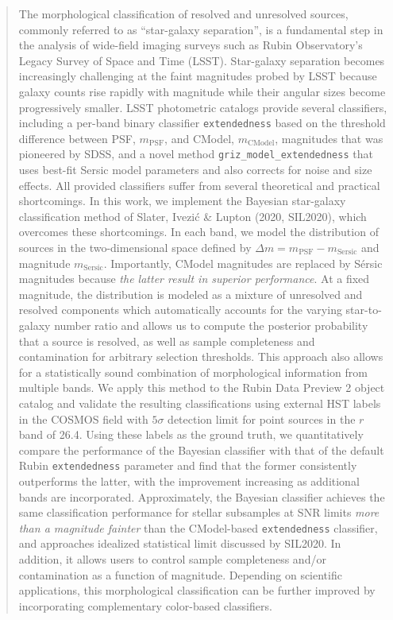 \documentclass[linenumbers,amsmath,trackchanges]{aastex702}
\begin{document}
\begin{abstract}
The morphological classification of resolved and unresolved sources, commonly referred to as ``star-galaxy
separation'', is a fundamental step in the analysis of wide-field imaging surveys such as Rubin Observatory's
Legacy Survey of Space and Time (LSST). Star-galaxy separation becomes increasingly challenging at
the faint magnitudes probed by LSST because galaxy counts rise rapidly with magnitude while their angular sizes become
progressively smaller. LSST photometric catalogs provide several classifiers, including a per-band binary classifier
\texttt{extendedness} based on the threshold difference between PSF, \(m_{\mathrm{PSF}}\), and CModel,
\(m_{\mathrm{CModel}}\), magnitudes that was pioneered by SDSS, and a novel method \texttt{griz\_model\_extendedness}
that uses best-fit Sersic model parameters and also corrects for noise and size effects.
All provided classifiers suffer from several theoretical and practical shortcomings. 
In this work, we implement the Bayesian star-galaxy classification method of Slater, Ivezi\'{c} \& Lupton (2020, SIL2020),
which overcomes these shortcomings. 
In each band, we model the distribution of sources in the two-dimensional space defined by
\(\Delta m = m_{\mathrm{PSF}} - m_{\mathrm{Sersic}}\) and magnitude \(m_{\mathrm{Sersic}}\).
Importantly, CModel magnitudes are replaced by S\'{e}rsic magnitudes because {\it the latter result in superior
performance}.  At a fixed magnitude, the distribution is modeled as a mixture of unresolved and resolved
components which automatically accounts for the varying star-to-galaxy number ratio and
allows us to compute the posterior probability that a source is resolved, as well as sample
completeness and contamination for arbitrary selection thresholds. This approach also allows for
a statistically sound combination of morphological information from multiple bands. 
We apply this method to the Rubin Data Preview 2 object catalog and validate the resulting classifications using external HST
labels in the COSMOS field with $5\sigma$ detection limit for point sources in the $r$ band of 26.4.
Using these labels as the ground truth, we quantitatively compare the performance of the Bayesian
classifier with that of the default Rubin \texttt{extendedness}
parameter and find that the former consistently outperforms the latter, with the improvement
increasing as additional bands are incorporated.  Approximately, the Bayesian classifier
achieves the same classification performance for stellar subsamples at SNR limits {\it more than a 
magnitude fainter} than the CModel-based \texttt{extendedness} classifier, and approaches idealized statistical limit
discussed by SIL2020. In addition, it allows users to control sample completeness and/or
contamination as a function of magnitude. Depending on scientific applications, this morphological classification can be
further improved by incorporating complementary color-based classifiers. 
\end{abstract}
\end{document}
